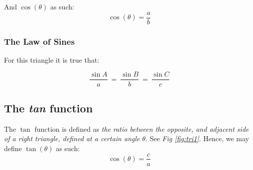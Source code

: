 \documentclass[a4paper, 12pt]{article}
\begin{document}
And $\cos(\theta)$ as such: $$\cos(\theta) = \frac{a}{b}$$








\subsubsection{The Law of Sines}



\begin{center}
 \bigbreak


For this triangle it is true that:
\end{center}
$$\frac{\sin{A}}{a} \ = \ \frac{\sin{B}}{b} \ = \ \frac{\sin{C}}{c}$$


\bigbreak







\subsection{The \emph{tan} function}



The $\tan$ function is defined as \emph{the ratio between the opposite, and adjacent side of a right triangle, defined at a certain angle $\theta$}. See \emph{Fig \ref{fig:tri1}}.
Hence, we may define $\tan(\theta)$ as such: \bigbreak
$$\cos(\theta) = \frac{c}{a}$$
\end{document}
